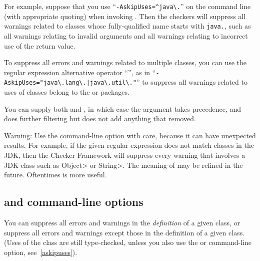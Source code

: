 For example, suppose that you use
``{\codesize\verb|-AskipUses=^java\.|}'' on the command line
(with appropriate quoting) when invoking
.  Then the checkers will suppress all warnings related to
classes whose fully-qualified name starts with \codesize\verb|java.|, such
as all warnings relating to invalid arguments and all warnings relating to
incorrect use of the return value.

To suppress all errors and warnings related to multiple classes, you can use
the regular expression alternative operator ``\code{|}'', as in
``{\codesize\verb+-AskipUses="java\.lang\.|java\.util\."+}'' to suppress
all warnings related to uses of classes belong to the  or
 packages.

You can supply both  and , in which case
the  argument takes precedence, and  does
further filtering but does not add anything that  removed.

Warning:  Use the  command-line option with care,
because it can have unexpected results.  For example, if the
given regular expression does not match classes in the JDK, then the
Checker Framework will suppress every warning that involves a JDK class
such as \<Object> or \<String>.  The meaning of  may be
refined in the future.  Oftentimes  is more useful.



\subsection{ and  command-line options\label{askipdefs}}

You can suppress all errors and warnings in the \emph{definition} of a given
class, or suppress all errors and warnings except those in the definition
of a given class.  (Uses of the class are still type-checked, unless you also use
the  or  command-line option,
see~\ref{askipuses}).

